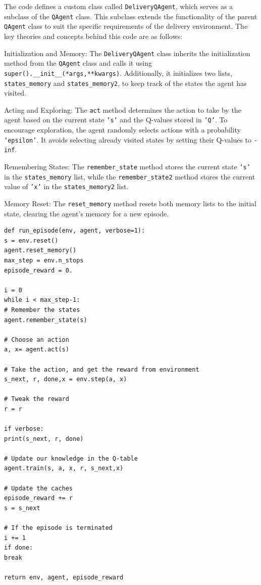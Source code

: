 \documentclass[12pt,a4paper,twoside]{report}
\begin{document}
The  code defines a custom class called \texttt{DeliveryQAgent}, which serves as a subclass of the \texttt{QAgent} class. This subclass extends the functionality of the parent \texttt{QAgent} class to suit the specific requirements of the delivery environment. The key theories and concepts behind this code are as follows:

Initialization and Memory: The \texttt{DeliveryQAgent} class inherits the initialization method from the \texttt{QAgent} class and calls it using\\ \texttt{super().\_\_init\_\_(*args,**kwargs)}. Additionally, it initializes two lists, \texttt{states\_memory} and \texttt{states\_memory2}, to keep track of the states the agent has visited.

Acting and Exploring: The \texttt{act} method determines the action to take by the agent based on the current state \texttt{'s'} and the Q-values stored in \texttt{'Q'}. To encourage exploration, the agent randomly selects actions with a probability \texttt{'epsilon'}. It avoids selecting already visited states by setting their Q-values to \texttt{-inf}.

Remembering States: The \texttt{remember\_state} method stores the current state \texttt{'s'} in the \texttt{states\_memory} list, while the \texttt{remember\_state2} method stores the current value of \texttt{'x'} in the \texttt{states\_memory2} list.

Memory Reset: The \texttt{reset\_memory} method resets both memory lists to the initial state, clearing the agent's memory for a new episode.


\begin{lstlisting}
def run_episode(env, agent, verbose=1):
s = env.reset()
agent.reset_memory()
max_step = env.n_stops
episode_reward = 0.

i = 0
while i < max_step-1:
# Remember the states
agent.remember_state(s)

# Choose an action
a, x= agent.act(s)

# Take the action, and get the reward from environment
s_next, r, done,x = env.step(a, x)

# Tweak the reward
r = r

if verbose:
print(s_next, r, done)

# Update our knowledge in the Q-table
agent.train(s, a, x, r, s_next,x)

# Update the caches
episode_reward += r
s = s_next

# If the episode is terminated
i += 1
if done:
break

return env, agent, episode_reward 
	
\end{lstlisting}
\end{document}
